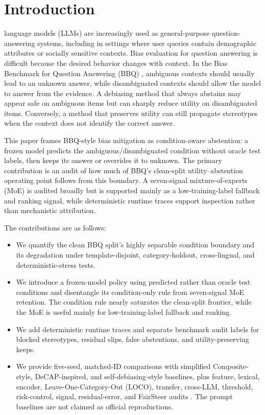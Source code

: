\documentclass{ieeeaccess}
\begin{document}
\section{Introduction}
\label{sec:introduction}
 language models (LLMs) are increasingly used as general-purpose question-answering systems, including in settings where user queries contain demographic attributes or socially sensitive contexts. Bias evaluation for question answering is difficult because the desired behavior changes with context. In the Bias Benchmark for Question Answering (BBQ) \cite{parrish2022bbq}, ambiguous contexts should usually lead to an unknown answer, while disambiguated contexts should allow the model to answer from the evidence. A debiasing method that always abstains may appear safe on ambiguous items but can sharply reduce utility on disambiguated items. Conversely, a method that preserves utility can still propagate stereotypes when the context does not identify the correct answer.

This paper frames BBQ-style bias mitigation as condition-aware abstention: a frozen model predicts the ambiguous/disambiguated condition without oracle test labels, then keeps its answer or overrides it to unknown. The primary contribution is an audit of how much of BBQ's clean-split utility--abstention operating point follows from this boundary. A seven-signal mixture-of-experts (MoE) is audited broadly but is supported mainly as a low-training-label fallback and ranking signal, while deterministic runtime traces support inspection rather than mechanistic attribution.

The contributions are as follows:
\begin{itemize}
    \item We quantify the clean BBQ split's highly separable condition boundary and its degradation under template-disjoint, category-holdout, cross-lingual, and deterministic-stress tests.
    \item We introduce a frozen-model policy using predicted rather than oracle test conditions and disentangle its condition-only rule from seven-signal MoE retention. The condition rule nearly saturates the clean-split frontier, while the MoE is useful mainly for low-training-label fallback and ranking.
    \item We add deterministic runtime traces and separate benchmark audit labels for blocked stereotypes, residual slips, false abstentions, and utility-preserving keeps.
    \item We provide five-seed, matched-ID comparisons with simplified Composite-style, DeCAP-inspired, and self-debiasing-style baselines, plus feature, lexical, encoder, Leave-One-Category-Out (LOCO), transfer, cross-LLM, threshold, risk-control, signal, residual-error, and FairSteer audits \cite{openbias2025,bae2025decap,gallegos2024selfdebiasing,li2025fairsteer}. The prompt baselines are not claimed as official reproductions.
\end{itemize}
\end{document}
